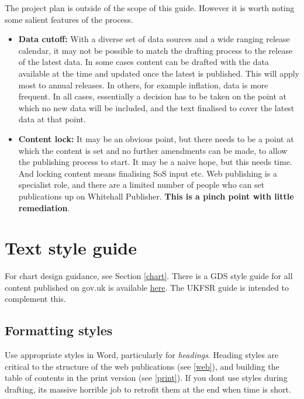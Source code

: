\documentclass[
]{book}
\begin{document}
The project plan is outside of the scope of this guide. However it is worth
noting some salient features of the process.

\begin{itemize}
\item
  \textbf{Data cutoff:} With a diverse set of data sources and a wide ranging release calendar, it may not be possible to match the drafting process to the release of the latest data. In some cases content can be drafted with the data available at the time and updated once the latest is published. This will apply most to annual releases. In others, for example inflation, data is more frequent. In all cases, essentially a decision has to be taken on the point at which no new data will be included, and the text finalised to cover the latest data at that point.
\item
  \textbf{Content lock:} It may be an obvious point, but there needs to be a point at which the content is set and no further amendments can be made, to allow the publishing process to start. It may be a naive hope, but this needs time. And locking content means finalising SoS input etc. Web publishing is a specialist role, and there are a limited number of people who can set publications up on Whitehall Publisher. \textbf{This is a pinch point with little remediation}.
\end{itemize}

\hypertarget{text}{%
\chapter{Text style guide}\label{text}}

For chart design guidance, see Section \ref{chart}. There is a GDS style guide
for all content published on gov.uk is available
\href{https://www.gov.uk/guidance/style-guide}{here}. The UKFSR guide is intended to
complement this.

\hypertarget{formatting-styles}{%
\section{Formatting styles}\label{formatting-styles}}

Use appropriate styles in Word, particularly for \emph{headings}. Heading styles are critical to the structure of the web publications (see \ref{web}), and building the table of contents in the print version (see \ref{print}). If you dont use styles during drafting, its massive horrible job to retrofit them at the end when time is short.
\end{document}
